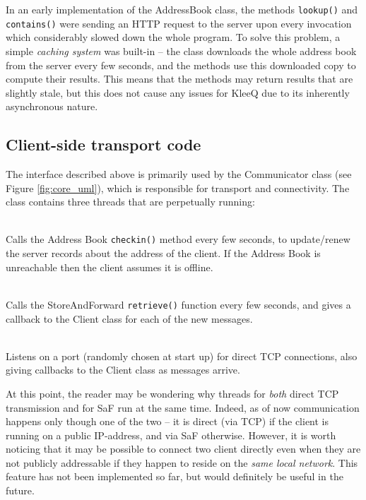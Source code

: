 \documentclass[a4paper, 12pt]{report}
\begin{document}
In an early implementation of the AddressBook class, the methods \texttt{lookup()} and \texttt{contains()} were sending an HTTP request to the server upon every invocation which considerably slowed down the whole program. To solve this problem, a simple \emph{caching system} was built-in -- the class downloads the whole address book from the server every few seconds, and the methods use this downloaded copy to compute their results. This means that the methods may return results that are slightly stale, but this does not cause any issues for KleeQ due to its inherently asynchronous nature. \\


\subsection{Client-side transport code}
\label{subsec:impl.prep.transport}
The interface described above is primarily used by the Communicator class (see Figure \ref{fig:core_uml}), which is responsible for transport and connectivity. The class contains three threads that are perpetually running:
\begin{description}[labelindent=0.5cm, leftmargin=1.3cm, rightmargin=0.5cm]
    \item[Address-reporting thread] \hfill \\
        Calls the Address Book \texttt{checkin()} method every few seconds, to update/renew the server records about the address of the client. If the Address Book is unreachable then the client assumes it is offline.
    \item[SaF Querying Thread] \hfill \\
        Calls the StoreAndForward \texttt{retrieve()} function every few seconds, and gives a callback to the Client class for each of the new messages.
    \item[TCP Socket Server Thread] \hfill \\
        Listens on a port (randomly chosen at start up) for direct TCP connections, also giving callbacks to the Client class as messages arrive.
\end{description}
At this point, the reader may be wondering why threads for \emph{both} direct TCP transmission and for SaF run at the same time. Indeed, as of now communication happens only though one of the two -- it is direct (via TCP) if the client is running on a public IP-address, and via SaF otherwise. However, it is worth noticing that it may be possible to connect two client directly even when they are not publicly addressable if they happen to reside on the \emph{same local network}. This feature has not been implemented so far, but would definitely be useful in the future. \\
\end{document}
